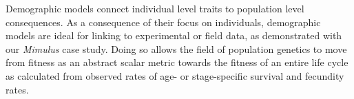 \documentclass[11pt]{article}
\begin{document}
Demographic models connect individual level traits to population level consequences. As a consequence of their focus on individuals, demographic models are ideal for linking to experimental or field data, as demonstrated with our \textit{Mimulus} case study. Doing so allows the field of population genetics to move from fitness as an abstract scalar metric towards the fitness of an entire life cycle as calculated from observed rates of age- or stage-specific survival and fecundity rates.  



 










\newpage{}




%
%
%
%
%
\end{document}
